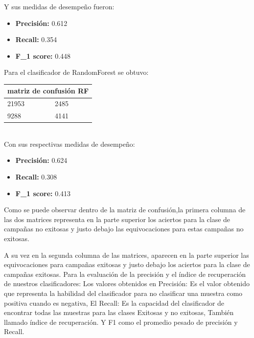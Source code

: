 \documentclass[journal]{IEEEtran}
\begin{document}
Y sus medidas de desempeño fueron:
\begin{itemize}
	\item \textbf{Precisión:} 0.612
	\item \textbf{Recall:} 0.354
	\item \textbf{F\_1 score:} 0.448
	
\end{itemize}

\hspace{2em}

Para el clasificador de RandomForest se obtuvo:


\hspace{2em}

\begin{tabular}{ ||p{3cm}||p{3cm}|| }
 \hline
 \multicolumn{2}{|c|}{matriz de confusión RF} \\
 \hline
 21953 & 2485  \\
 \hline
 9288   & 4141 \\
 \hline
\end{tabular}\\

Con sus respectivas medidas de desempeño:

\begin{itemize}
	\item \textbf{Precisión:} 0.624
	\item \textbf{Recall:} 0.308
	\item \textbf{F\_1 score:} 0.413
	
\end{itemize}

	
Como se puede observar dentro de la matriz de confusión,la primera columna de las dos matrices representa en la parte superior los aciertos para la clase de campañas no exitosas y justo debajo las equivocaciones para estas campañas no exitosas.

A su vez en la segunda columna de las matrices, aparecen en la parte superior las equivocaciones para campañas exitosas y justo debajo los aciertos para la clase de campañas exitosas.
Para la evaluación de  la precisión y el índice de recuperación de nuestros clasificadores: Los valores obtenidos en Precisión: Es el valor obtenido que representa la habilidad del clasificador para  no clasificar una muestra como positiva cuando es negativa, El Recall: Es la capacidad del clasificador de encontrar todas las muestras para las clases Exitosas y no exitosas, También llamado índice de recuperación. Y F1 como el promedio pesado de precisión y Recall. 
\end{document}

